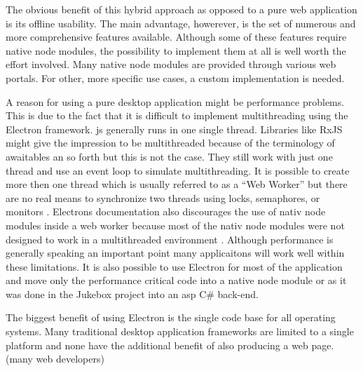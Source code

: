 The obvious benefit of this hybrid approach as opposed to a pure web application is its offline usability.  The main advantage, howerever, is the set of numerous and more comprehensive features available. Although some of these features require native node modules, the possibility to implement them at all is well worth the effort involved. Many native node modules are provided through various web portals. For other, more specific use cases, a custom implementation is needed.


A reason for using a pure desktop application might be performance problems. This is due to the fact that it is difficult to implement multithreading using the Electron framework. \gls{js} generally runs in one single thread. Libraries like RxJS might give the impression to be multithreaded because of the terminology of awaitables an so forth but this is not the case. They still work with just one thread and use an event loop to simulate multithreading. It is possible to create more then one thread which is usually referred to as a \enquote{Web Worker} but there are no real means to synchronize two threads using locks, semaphores, or monitors \cite{jsWebWorkers}. Electrons documentation also discourages the use of nativ node modules inside a web worker because most of the nativ node modules were not designed to work in a multithreaded environment \cite{electronMultithreading}. Although performance is generally speaking an important point many applicaitons will work well within these limitations. It is also possible to use Electron for most of the application and move only the performance critical code into a native node module or as it was done in the Jukebox project into an \gls{asp} C\# back-end.

The biggest benefit of using Electron is the single code base for all operating systems. Many traditional desktop application frameworks are limited to a single platform and none have the additional benefit of also producing a web page. (many web developers)
